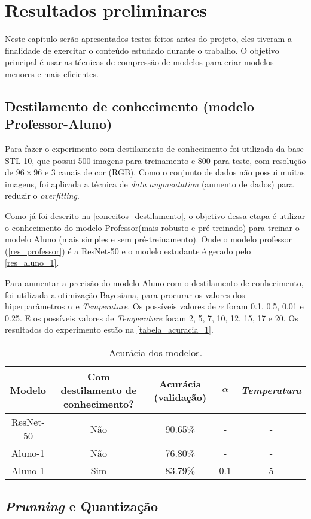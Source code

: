 \chapter{Resultados preliminares}

Neste capítulo serão apresentados testes feitos antes do projeto, eles tiveram a finalidade de exercitar o
conteúdo estudado durante o trabalho. O objetivo principal é usar as técnicas de compressão de modelos para
criar modelos menores e mais eficientes.


\section{Destilamento de conhecimento (modelo Professor-Aluno)}
Para fazer o experimento com destilamento de conhecimento foi utilizada da base STL-10, que possui 500 imagens para
treinamento e 800 para teste, com resolução de $96 \times 96$ e 3 canais de cor (RGB). Como o conjunto de dados
não possui muitas imagens, foi aplicada a técnica de \textit{data augmentation} (aumento de dados) para reduzir o
\textit{overfitting}.

Como já foi descrito na \autoref{conceitos_destilamento}, o objetivo dessa etapa é utilizar o conhecimento do modelo
Professor(mais robusto e pré-treinado) para treinar o modelo Aluno (mais simples e sem pré-treinamento).
Onde o modelo professor (\autoref{res_professor}) é a ResNet-50  \cite{resnet} e o modelo estudante é gerado pelo
\autoref{res_aluno_1}.

Para aumentar a precisão do modelo Aluno com o destilamento de conhecimento, foi utilizada a otimização
Bayesiana, para procurar os valores dos hiperparâmetros $\alpha$ e \textit{Temperature}.
Os possíveis valores de $\alpha$ foram 0.1, 0.5, 0.01 e 0.25.
E os possíveis valores de \textit{Temperature} foram 2, 5, 7, 10, 12, 15, 17 e 20.
Os resultados do experimento estão na \autoref{tabela_acuracia_1}.

\begin{center}
\begin{table}[htb]
\ABNTEXfontereduzida
\caption[Acurácia dos modelos]{Acurácia dos modelos.}
\label{tabela_acuracia_1}
\begin{tabular}{ |c|c|c|c|c| }
	\hline
	\textbf{Modelo} & \textbf{Com destilamento de conhecimento?}  & \textbf{Acurácia (validação)}
		   & \textbf{$\alpha$} & \textbf{\textit{Temperatura}} \\
	\hline
	ResNet-50 	& 	Não 	& 	90.65\%	& 	- 	& 	-	 \\
	Aluno-1 	& 	Não 	& 	76.80\%	& 	- 	& 	-	 \\
	Aluno-1 	& 	Sim 	& 	83.79\%	& 	0.1 	& 	5	 \\
	\hline
\end{tabular}
\end{table}
\end{center}

\section{\textit{Prunning} e Quantização}
